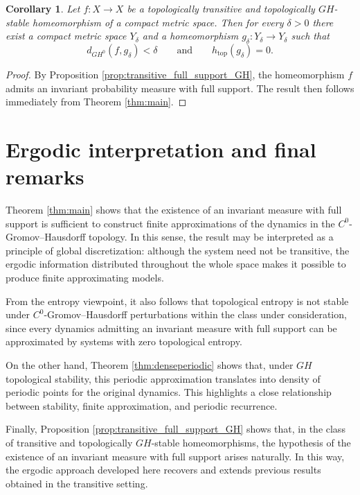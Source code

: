 \documentclass{amsart}
\numberwithin{equation}{section}
\newtheorem{corollary}[theorem]{Corollary}
\theoremstyle{remark}
\DeclareMathOperator{\topo}{top}
\begin{document}
\begin{corollary}\label{cor:transitive_GH_zero_entropy}
Let $f:X\to X$ be a topologically transitive and topologically $GH$-stable homeomorphism of a compact metric space. Then for every $\delta>0$ there exist a compact metric space $Y_\delta$ and a homeomorphism $g_\delta:Y_\delta\to Y_\delta$ such that
\[
d_{GH^0}(f,g_\delta)<\delta
\qquad\text{and}\qquad
h_{\topo}(g_\delta)=0.
\]
\end{corollary}

\begin{proof}
By Proposition \ref{prop:transitive_full_support_GH}, the homeomorphism $f$ admits an invariant probability measure with full support. The result then follows immediately from Theorem \ref{thm:main}.
\end{proof}

\section{Ergodic interpretation and final remarks}

Theorem \ref{thm:main} shows that the existence of an invariant measure with full support is sufficient to construct finite approximations of the dynamics in the $C^0$-Gromov--Hausdorff topology. In this sense, the result may be interpreted as a principle of global discretization: although the system need not be transitive, the ergodic information distributed throughout the whole space makes it possible to produce finite approximating models.

From the entropy viewpoint, it also follows that topological entropy is not stable under $C^0$-Gromov--Hausdorff perturbations within the class under consideration, since every dynamics admitting an invariant measure with full support can be approximated by systems with zero topological entropy.

On the other hand, Theorem \ref{thm:denseperiodic} shows that, under $GH$ topological stability, this periodic approximation translates into density of periodic points for the original dynamics. This highlights a close relationship between stability, finite approximation, and periodic recurrence.

Finally, Proposition \ref{prop:transitive_full_support_GH} shows that, in the class of transitive and topologically $GH$-stable homeomorphisms, the hypothesis of the existence of an invariant measure with full support arises naturally. In this way, the ergodic approach developed here recovers and extends previous results obtained in the transitive setting.
\end{document}
